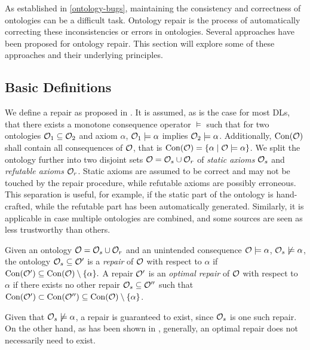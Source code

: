 
As established in \cref{ontology-bugs}, maintaining the consistency and correctness of ontologies can be a difficult task. Ontology repair is the process of automatically correcting these inconsistencies or errors in ontologies. Several approaches have been proposed for ontology repair. This section will explore some of these approaches and their underlying principles.

\subsection{Basic Definitions} \label{basic-definitions}

We define a repair as proposed in \cite{baader2018making}. It is assumed, as is the case for most DLs, that there exists a monotone consequence operator $\models$ such that for two ontologies $\mathcal{O}_1 \subseteq \mathcal{O}_2$ and axiom $\alpha$, $\mathcal{O}_1 \models \alpha$ implies $\mathcal{O}_2 \models \alpha$. Additionally, $\operatorname{Con}(\mathcal{O})$ shall contain all consequences of $\mathcal{O}$, that is $\operatorname{Con}(\mathcal{O}) = \{ \alpha \mid \mathcal{O} \models \alpha \}$. We split the ontology further into two disjoint sets $\mathcal{O} = \mathcal{O}_s \cup \mathcal{O}_r$ of \emph{static axioms} $\mathcal{O}_s$ and \emph{refutable axioms} $\mathcal{O}_r$. Static axioms are assumed to be correct and may not be touched by the repair procedure, while refutable axioms are possibly erroneous. This separation is useful, for example, if the static part of the ontology is hand-crafted, while the refutable part has been automatically generated. Similarly, it is applicable in case multiple ontologies are combined, and some sources are seen as less trustworthy than others.

\begin{definition}
  Given an ontology $\mathcal{O} = \mathcal{O}_s \cup \mathcal{O}_r$ and an unintended consequence $\mathcal{O} \models \alpha$, $\mathcal{O}_s \not\models \alpha$, the ontology $\mathcal{O}_s \subseteq \mathcal{O}'$ is a \emph{repair} of $\mathcal{O}$ with respect to $\alpha$ if $\operatorname{Con}(\mathcal{O}') \subseteq \operatorname{Con}(\mathcal{O}) \setminus \{\alpha\}.$ A repair $\mathcal{O}'$ is an \emph{optimal repair} of $\mathcal{O}$ with respect to $\alpha$ if there exists no other repair $\mathcal{O}_s \subseteq \mathcal{O}''$ such that $\operatorname{Con}(\mathcal{O}') \subset \operatorname{Con}(\mathcal{O}'') \subseteq \operatorname{Con}(\mathcal{O}) \setminus \{\alpha\}$.
\end{definition}

Given that $\mathcal{O}_s \not\models \alpha$, a repair is guaranteed to exist, since $\mathcal{O}_s$ is one such repair. On the other hand, as has been shown in \cite{baader2018making}, generally, an optimal repair does not necessarily need to exist.

